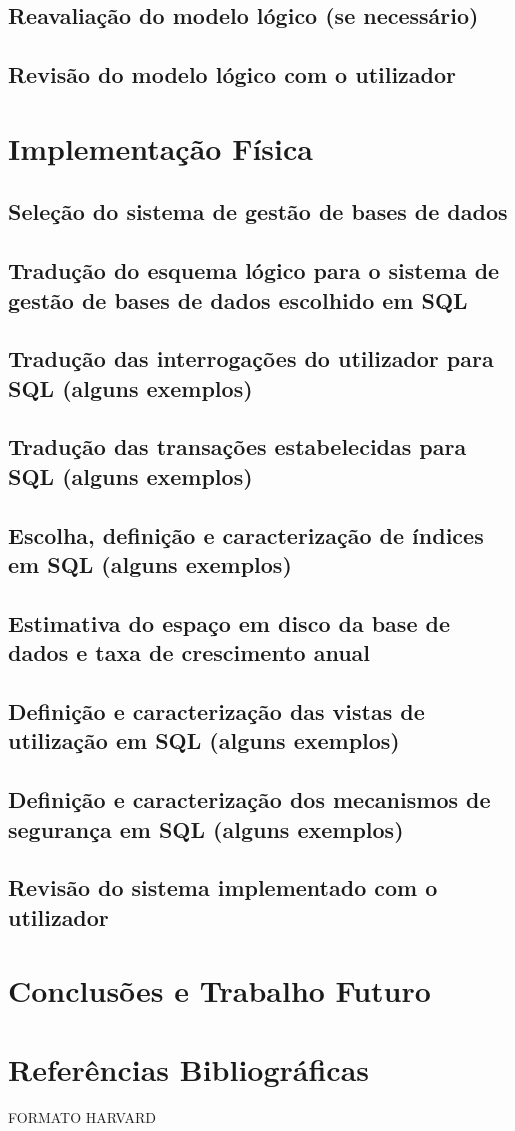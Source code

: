 \documentclass[a4paper]{article}
\begin{document}
\subsection{Reavaliação do modelo lógico (se necessário)}
\subsection{Revisão do modelo lógico com o utilizador}

\section{Implementação Física}
\label{sec:5}

\subsection{Seleção do sistema de gestão de bases de dados}
\subsection{Tradução do esquema lógico para o sistema de gestão de bases de dados escolhido em SQL}
\subsection{Tradução das interrogações do utilizador para SQL (alguns exemplos)}
\subsection{Tradução das transações estabelecidas para SQL (alguns exemplos)}
\subsection{Escolha, definição e caracterização de índices em SQL (alguns exemplos)}
\subsection{Estimativa do espaço em disco da base de dados e taxa de crescimento anual}
\subsection{Definição e caracterização das vistas de utilização em SQL (alguns exemplos)}
\subsection{Definição e caracterização dos mecanismos de segurança em SQL (alguns exemplos)}
\subsection{Revisão do sistema implementado com o utilizador}

\pagebreak

\section{Conclusões e Trabalho Futuro}
\label{sec:6}

\section{Referências Bibliográficas}
\label{sec:7}

FORMATO HARVARD
\end{document}
